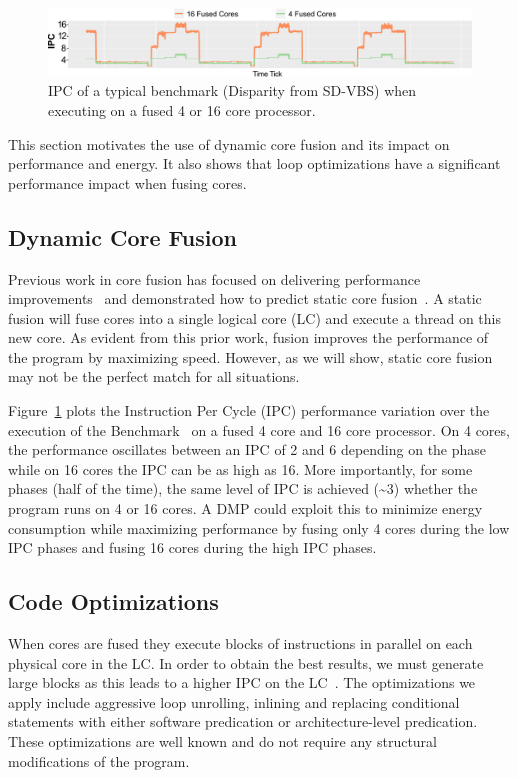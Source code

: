 \begin{figure}[t]
    \centering
    \includegraphics[width=\textwidth]{graphics/motivation/disp_opt_4_16_3.pdf}
\vspace*{-5mm}
    \caption{IPC of a typical benchmark (Disparity from SD-VBS) when executing on a fused 4 or 16 core processor.} 
    \label{fig:disp_ex}
\end{figure}

This section motivates the use of dynamic core fusion and its impact on performance and energy.
It also shows that loop optimizations have a significant performance impact when fusing cores.

\subsection{Dynamic Core Fusion}
Previous work in core fusion has focused on delivering performance improvements~\cite{ipek2007CoreFusion,kim2007tflex} and demonstrated how to predict static core fusion~\cite{micolet2016dmpstream}.
A static fusion will fuse cores into a single logical core (LC) and execute a thread on this new core.
As evident from this prior work, fusion improves the performance of the program by maximizing speed.
However, as we will show, static core fusion may not be the perfect match for all situations.

Figure~\ref{fig:disp_ex} plots the Instruction Per Cycle (IPC) performance variation over the execution of the  Benchmark~\cite{sdvbs} on a fused 4 core and 16 core processor.
On 4 cores, the performance oscillates between an IPC of 2 and 6 depending on the phase while on 16 cores the IPC can be as high as 16.
More importantly, for some phases (half of the time), the same level of IPC is achieved (\textasciitilde3) whether the program runs on 4 or 16 cores.
A DMP could exploit this to minimize energy consumption while maximizing performance by fusing only 4 cores during the low IPC phases and fusing 16 cores during the high IPC phases.

\subsection{Code Optimizations}
When cores are fused they execute blocks of instructions in parallel on each physical core in the LC.
In order to obtain the best results, we must generate large blocks as this leads to a higher IPC on the LC~\cite{micolet2016dmpstream}.
The optimizations we apply include aggressive loop unrolling, inlining and replacing conditional statements with either software predication or architecture-level predication.
These optimizations are well known and do not require any structural modifications of the program.

